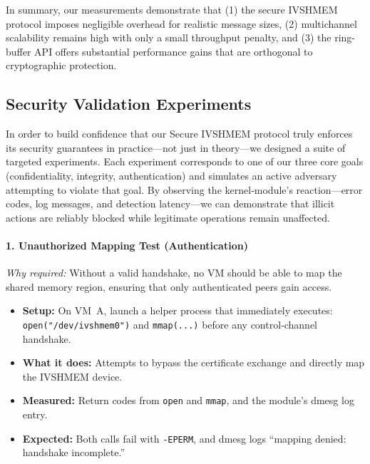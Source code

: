 \documentclass[conference]{IEEEtran}
\begin{document}
In summary, our measurements demonstrate that (1) the secure IVSHMEM protocol
imposes negligible overhead for realistic message sizes, (2) multichannel
scalability remains high with only a small throughput penalty, and (3) the
ring-buffer API offers substantial performance gains that are orthogonal to
cryptographic protection.

\subsection{Security Validation Experiments}

In order to build confidence that our Secure IVSHMEM protocol truly enforces
its security guarantees in practice—not just in theory—we designed a suite of
targeted experiments. Each experiment corresponds to one of our three core
goals (confidentiality, integrity, authentication) and simulates an active
adversary attempting to violate that goal. By observing the kernel‐module’s
reaction—error codes, log messages, and detection latency—we can demonstrate
that illicit actions are reliably blocked while legitimate operations remain
unaffected.

\paragraph{1. Unauthorized Mapping Test (Authentication)}
\emph{Why required:} Without a valid handshake, no VM should be able to map the shared memory region, ensuring that only authenticated peers gain access.
\begin{itemize}
  \item \textbf{Setup:} On VM~A, launch a helper process that immediately executes:
        \texttt{open("/dev/ivshmem0")} and \texttt{mmap(...)} before any control‐channel handshake.
  \item \textbf{What it does:} Attempts to bypass the certificate exchange and directly map the IVSHMEM device.
  \item \textbf{Measured:} Return codes from \texttt{open} and \texttt{mmap}, and the module’s dmesg log entry.
  \item \textbf{Expected:} Both calls fail with \texttt{-EPERM}, and dmesg logs “mapping denied: handshake incomplete.”
\end{itemize}
\end{document}
